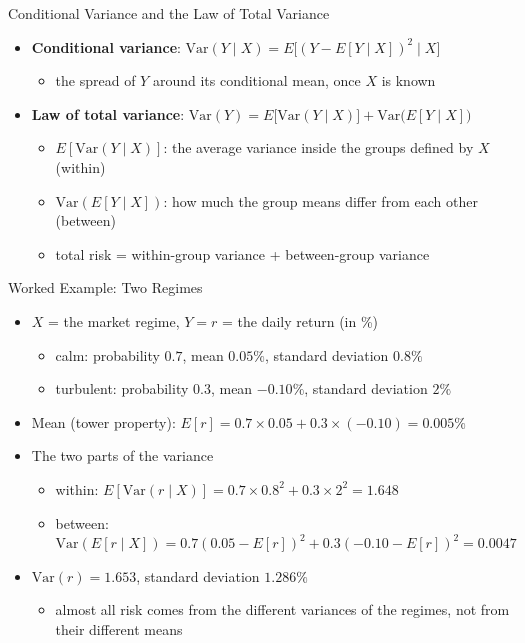 \begin{frame}{Conditional Variance and the Law of Total Variance}
\itemsize{\small}
\begin{itemize}
    \item \textbf{Conditional variance}: $\text{Var}(Y \mid X) = E\big[(Y - E[Y \mid X])^2 \mid X\big]$
    \begin{itemize}
        \item the spread of $Y$ around its conditional mean, once $X$ is known
    \end{itemize}
    \item \textbf{Law of total variance}: $\text{Var}(Y) = E\big[\text{Var}(Y \mid X)\big] + \text{Var}\big(E[Y \mid X]\big)$
    \begin{itemize}
        \item $E[\text{Var}(Y \mid X)]$: the average variance inside the groups defined by $X$ (within)
        \item $\text{Var}(E[Y \mid X])$: how much the group means differ from each other (between)
        \item total risk = within-group variance + between-group variance
    \end{itemize}
\end{itemize}
\end{frame}

\begin{frame}{Worked Example: Two Regimes}
\itemsize{\footnotesize}
\begin{itemize}
    \item $X$ = the market regime, $Y = r$ = the daily return (in \%)
    \begin{itemize}
        \item calm: probability $0.7$, mean $0.05\%$, standard deviation $0.8\%$
        \item turbulent: probability $0.3$, mean $-0.10\%$, standard deviation $2\%$
    \end{itemize}
    \item Mean (tower property): $E[r] = 0.7 \times 0.05 + 0.3 \times (-0.10) = 0.005\%$
    \item The two parts of the variance
    \begin{itemize}
        \item within: $E[\text{Var}(r \mid X)] = 0.7 \times 0.8^2 + 0.3 \times 2^2 = 1.648$
        \item between: $\text{Var}(E[r \mid X]) = 0.7(0.05 - E[r])^2 + 0.3(-0.10 - E[r])^2 = 0.0047$
    \end{itemize}
    \item $\text{Var}(r) = 1.653$, standard deviation $1.286\%$
    \begin{itemize}
        \item almost all risk comes from the different variances of the regimes, not from their different means
    \end{itemize}
\end{itemize}
\end{frame}

